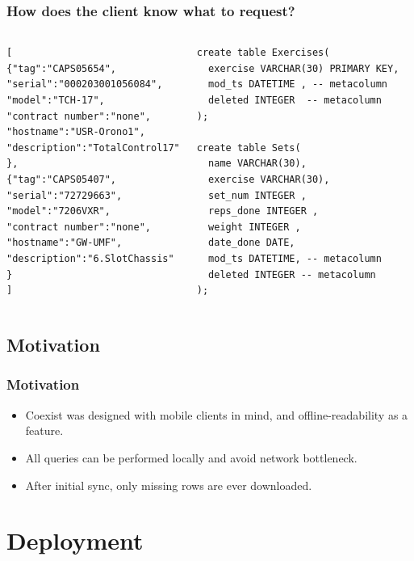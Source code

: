 \documentclass[]{beamer}
\begin{document}
\begin{frame}[fragile]
\frametitle{How does the client know what to request?}


\begin{columns}[c]
\column{2in}
\begin{lstlisting}
[
{"tag":"CAPS05654",
"serial":"000203001056084",
"model":"TCH-17",
"contract number":"none",
"hostname":"USR-Orono1",
"description":"TotalControl17"
},
{"tag":"CAPS05407",
"serial":"72729663",
"model":"7206VXR",
"contract number":"none",
"hostname":"GW-UMF",
"description":"6.SlotChassis"
}
]
\end{lstlisting}
\column{2in}

\begin{lstlisting}
create table Exercises(
  exercise VARCHAR(30) PRIMARY KEY,
  mod_ts DATETIME , -- metacolumn
  deleted INTEGER  -- metacolumn
);

create table Sets(
  name VARCHAR(30),
  exercise VARCHAR(30),
  set_num INTEGER ,
  reps_done INTEGER ,
  weight INTEGER ,
  date_done DATE,
  mod_ts DATETIME, -- metacolumn
  deleted INTEGER -- metacolumn
);

\end{lstlisting}

\end{columns}

\end{frame}


\subsection{Motivation}

\begin{frame}
\frametitle{Motivation}

\begin{itemize}
\item Coexist was designed with mobile clients in mind, and offline-readability as a feature.
\item All queries can be performed locally and avoid network bottleneck.
\item After initial sync, only missing rows are ever downloaded. 
\end{itemize}

\end{frame}




\section{Deployment}
\end{document}
